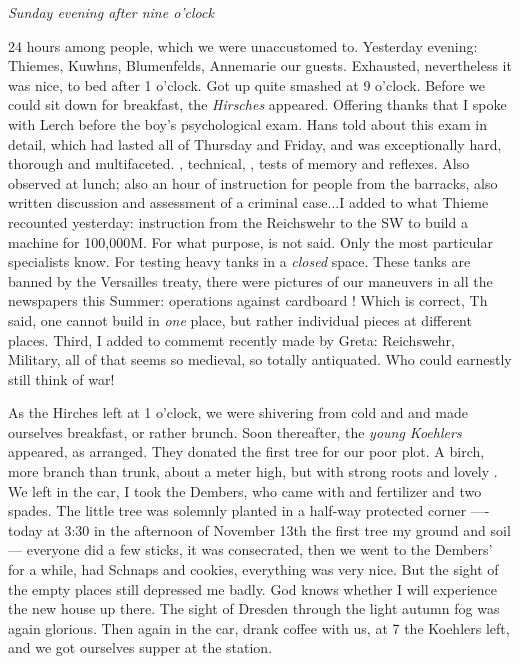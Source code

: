 \textit{Sunday evening after nine o'clock}

24 hours among people, which we were unaccustomed to. Yesterday evening: Thiemes, Kuwhns, Blumenfelds, Annemarie our guests. Exhausted, nevertheless it was nice, to bed after 1 o'clock. Got up quite smashed at 9 o'clock. Before we could sit down for breakfast, the \textit{Hirsches} appeared. Offering thanks that I spoke with Lerch before the boy's psychological exam. Hans told about this exam in detail, which had lasted all of Thursday and Friday, and was exceptionally hard, thorough and multifaceted. , technical, , tests of memory and reflexes. Also observed at lunch; also an hour of instruction for people from the barracks, also written discussion and assessment of a criminal case...I added to what Thieme recounted yesterday: instruction from the Reichswehr to the SW to build a machine for 100,000M. For what purpose, is not said. Only the most particular specialists know. For testing heavy tanks in a \textit{closed} space.  These tanks are banned by the Versailles treaty, there were pictures of our maneuvers in all the newspapers this Summer: operations against cardboard ! Which is correct, Th said, one cannot build in \textit{one} place, but rather individual pieces at different places. 
Third, I added to commemt recently made by Greta: Reichswehr, Military, all of that seems so medieval, so totally antiquated. Who could earnestly still think of war!

As the Hirches left at 1 o'clock, we were shivering from cold and  and made ourselves breakfast, or rather brunch. Soon thereafter, the \textit{young Koehlers} appeared, as arranged. They donated the first tree for our poor plot. A birch, more branch than trunk, about a meter high, but with strong roots and lovely . We left in the car, I took the Dembers, who came with  and fertilizer and two spades. The little tree was solemnly planted in a half-way protected corner —- today at 3:30 in the afternoon of November 13th the first tree my ground and soil — everyone did a few sticks, it was consecrated, then we went to the Dembers' for a while, had Schnaps and cookies, everything was very nice. But the sight of the empty places still 	depressed me badly. God knows whether I will experience the new house up there. The sight of Dresden through the light autumn fog was again glorious. Then again in the car, drank coffee with us, at 7 the Koehlers left, and we got ourselves supper at the station.

